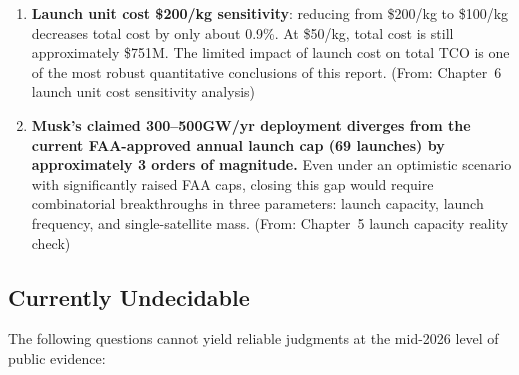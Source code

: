 \begin{enumerate}[leftmargin=*]
    \item \textbf{Launch unit cost \$200/kg sensitivity}: reducing from \$200/kg to \$100/kg decreases total cost by only about 0.9\%. At \$50/kg, total cost is still approximately \$751M. The limited impact of launch cost on total TCO is one of the most robust quantitative conclusions of this report. (From: Chapter~6 launch unit cost sensitivity analysis)

    \item \textbf{Musk's claimed 300--500\;GW/yr deployment diverges from the current FAA-approved annual launch cap (69 launches) by approximately 3 orders of magnitude.} Even under an optimistic scenario with significantly raised FAA caps, closing this gap would require combinatorial breakthroughs in three parameters: launch capacity, launch frequency, and single-satellite mass. (From: Chapter~5 launch capacity reality check)
\end{enumerate}

\subsection{Currently Undecidable}

The following questions cannot yield reliable judgments at the mid-2026 level of public evidence:

